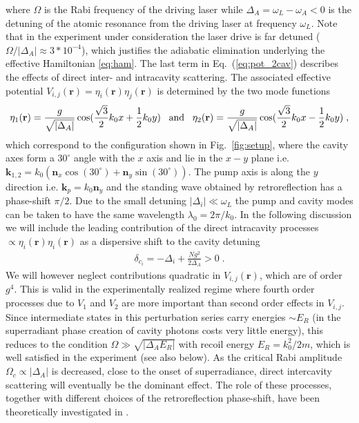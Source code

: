 \documentclass[12pt]{iopart}
\begin{document}
where $\Omega$ is the Rabi frequency of the driving laser while 
$\Delta_A=\omega_L-\omega_A<0$ is the detuning of the atomic resonance from the 
driving laser at frequency $\omega_L$. Note that in the experiment under consideration \cite{leonard2016supersolid,leonard_supersolid_goldstone} the laser drive is far detuned ($\Omega/|\Delta_A|\approx 3*10^{-4}$), which justifies the adiabatic elimination underlying the effective Hamiltonian \eqref{eq:ham}. 
The last term in Eq.~(\ref{eq:pot_2cav}) describes the effects of direct inter- and 
intracavity scattering. The associated effective potential $V_{i,j}(\mathbf{r})=\eta_i(\mathbf{r})\eta_j(\mathbf{r})$
is determined by the two mode functions
\begin{align}
\eta_1(\mathbf{r})=\frac{g}{\sqrt{|\Delta_A|}}\cos(\frac{\sqrt{3}}{2}k_0x+\frac{1}{2}k_0y)\;\;\; {\rm and} \;\;\; 
\eta_2(\mathbf{r})=\frac{g}{\sqrt{|\Delta_A|}}\cos(\frac{\sqrt{3}}{2}k_0x-\frac{1}{2}k_0y)\;,
\end{align}
which correspond to the configuration shown in Fig.~\ref{fig:setup}, where
the cavity axes form a $30^\circ$ angle with the $x$ axis and lie in
the $x-y$ plane i.e. $\mathbf{k}_{1,2}=k_0(\mathbf{n}_x
\cos(30^\circ)+\mathbf{n}_y \sin(30^\circ))$. The pump axis is
along the $y$ direction i.e. $\mathbf{k}_p=k_0 \mathbf{n}_y $ and the standing wave
obtained by retroreflection has a phase-shift $\pi/2$. Due to the small detuning $|\Delta_i|\ll\omega_L$ the pump and cavity modes can be taken to have the same wavelength $\lambda_0=2\pi/k_0$.
In the following discussion we will include the leading contribution 
of the direct intracavity processes $\propto \eta_i(\mathbf{r})\eta_i(\mathbf{r})$ as a dispersive shift to the cavity detuning
\begin{align}
\delta_{c_i}=-\Delta_i+\frac{N g^2}{2 \Delta_A}>0\;.
\end{align}
We will however neglect contributions quadratic in $V_{i,j}(\mathbf{r})$, which are of order $g^4$. This is valid in the experimentally realized regime
where fourth order processes due to $V_1$ and $V_2$ are more important than second order effects in $V_{i,j}$. Since intermediate states in this perturbation series carry energies $\sim E_R$ (in the superradiant phase creation of cavity photons costs very little energy), this reduces to the condition $\Omega\gg \sqrt{|\Delta_A E_R|}$ with recoil energy $E_R=k_0^2/2m$, which is well satisfied in the experiment (see also below). As the critical Rabi amplitude $\Omega_c \propto |\Delta_A|$ is decreased, close to the onset of superradiance, direct intercavity scattering will eventually be the dominant effect. The role of these processes, together with different choices
of the retroreflection phase-shift, have been theoretically
investigated in \cite{safei_2015,vestigial_order}.
\end{document}
